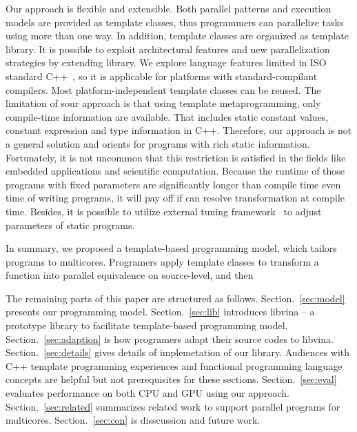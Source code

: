 Our approach is flexible and extensible. Both parallel patterns and
execution models are provided as template classes, thus programmers can
parallelize tasks using more than one way. In addition, template
classes are organized as template library. It is
possible to exploit architectural
features and new parallelization strategies by extending library. We
explore language features limited in ISO
standard C++~\cite{c++98, c++03, c++0x}, so it is applicable for
platforms with standard-compilant compilers. Most 
platform-independent template classes can be reused. The limitation of
sour approach is that using template metaprogramming, only compile-time
information are available. That includes static constant values,
constant expression and type information in C++. Therefore, our
approach is not a general solution and orients for programs with rich
static information. Fortunately, it is not uncommon that this
restriction is satisfied in the fields like embedded applications and
scientific computation. Because the runtime of those programs with fixed
parameters are significantly longer than compile time even time of
writing programs, it will pay off if can resolve transformation at
compile time. Besides, it is possible to utilize external
tuning framework~\cite{tuningfrm} to adjust parameters of static programs.

In summary, we proposed a template-based programming model, which 
tailors programs to multicores. Programers apply template classes to
transform a function into parallel equivalence on source-level, and then

The remaining parts of this paper are structured as follows.
Section.~\ref{sec:model} presents our programming model. Section.~\ref{sec:lib} introduces libvina
-- a prototype library to facilitate template-based programming model.
Section.~\ref{sec:adaption} is how programers adapt their source codes to libvina. Section.~\ref{sec:details} gives details of
implemetation of our library. Audiences with C++ template
programming experiences and functional programming language concepts
are helpful but not prerequisites for these sections. Section.~\ref{sec:eval}
evaluates performance on both CPU and GPU using our approach.
Section.~\ref{sec:related} summarizes related work to support parallel programs
for multicores. Section.~\ref{sec:con} is disscussion and future work.

